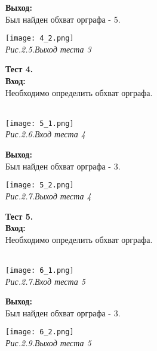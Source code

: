 \documentclass[a4paper,11pt]{article}
\begin{document}
\begin{flushleft}
\large{\textbf{Выход:}} \\ 
Был найден обхват орграфа - 5.
\end{flushleft}
\texttt{[image: 4\_2.png]} \\ \textit{Рис.2.5.Выход теста 3} \\
\begin{flushleft}
\large{\textbf{Тест 4.}} \\
\large{\textbf{Вход:}} \\
Необходимо определить обхват орграфа. \\
\end{flushleft} \\ 
\texttt{[image: 5\_1.png]} \\ \textit{Рис.2.6.Вход теста 4} \\
\begin{flushleft}
\large{\textbf{Выход:}} \\ 
Был найден обхват орграфа - 3.
\end{flushleft}
\texttt{[image: 5\_2.png]} \\ \textit{Рис.2.7.Выход теста 4} \\
\begin{flushleft}
\large{\textbf{Тест 5.}} \\
\large{\textbf{Вход:}} \\
Необходимо определить обхват орграфа. \\
\end{flushleft} \\ 
\texttt{[image: 6\_1.png]} \\ \textit{Рис.2.7.Вход теста 5} \\
\begin{flushleft}
\large{\textbf{Выход:}} \\ 
Был найден обхват орграфа - 3.
\end{flushleft}
\texttt{[image: 6\_2.png]} \\ \textit{Рис.2.9.Выход теста 5} \\
\end{document}
